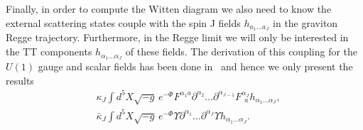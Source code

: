 \documentclass[preprint, 12pt]{elsarticle}
\begin{document}
Finally, in order to compute the Witten diagram we also need to know the external scattering states couple with the spin J fields $h_{a_1 \dots a_J}$ in the graviton Regge trajectory. 
Furthermore, in the Regge limit we will only be interested in the TT components $h_{\alpha_1 \dots \alpha_J}$ of these fields. The derivation of this coupling for the $U\left(1\right)$ gauge and scalar fields has been done in~\cite{ballon_bayona_unity_2017} and hence we only present the results
\begin{align}
 &\kappa_J  \int  d^5 X \sqrt{-g} \, e^{-\Phi }   F^{\alpha_1 a} \partial^{\alpha_2} \dots \partial^{\alpha_{J-1}}F^{\alpha_J}_{\ \ a} h_{\alpha_1\dots \alpha_J}, \\
 \label{eq:scalar_spin_J_coupling}
 &\bar{\kappa}_J  \int  d^5 X \sqrt{-g} \, e^{-\Phi }   \Upsilon \partial^{\alpha_1} \dots \partial^{\alpha_{J}} \Upsilon h_{\alpha_1\dots \alpha_J} .
\end{align}
\end{document}

